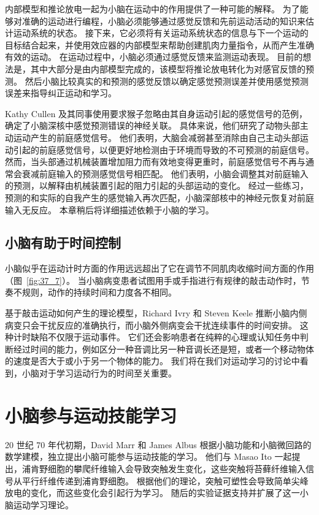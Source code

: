 内部模型和推论放电一起为小脑在运动中的作用提供了一种可能的解释。
为了能够对准确的运动进行编程，小脑必须能够通过感觉反馈和先前运动活动的知识来估计运动系统的状态。
接下来，它必须将有关运动系统状态的信息与下一个运动的目标结合起来，并使用效应器的内部模型来帮助创建肌肉力量指令，从而产生准确有效的运动。
在运动过程中，小脑必须通过感觉反馈来监测运动表现。
目前的想法是，其中大部分是由内部模型完成的，该模型将推论放电转化为对感官反馈的预测。
然后小脑比较真实的和预测的感觉反馈以确定感觉预测误差并使用感觉预测误差来指导纠正运动和学习。


Kathy Cullen 及其同事使用要求猴子忽略由其自身运动引起的感觉信号的范例，确定了小脑深核中感觉预测错误的神经关联。
具体来说，他们研究了动物头部主动运动产生的前庭感觉信号。
他们表明，大脑会减弱甚至消除由自己主动头部运动引起的前庭感觉信号，以便更好地检测由于环境而导致的不可预测的前庭信号。
然而，当头部通过机械装置增加阻力而有效地变得更重时，前庭感觉信号不再与通常会衰减前庭输入的预测感觉信号相匹配。
他们表明，小脑会调整其对前庭输入的预测，以解释由机械装置引起的阻力引起的头部运动的变化。
经过一些练习，预测的和实际的自我产生的感觉输入再次匹配，小脑深部核中的神经元恢复对前庭输入无反应。
本章稍后将详细描述依赖于小脑的学习。



\subsection{小脑有助于时间控制}

小脑似乎在运动计时方面的作用远远超出了它在调节不同肌肉收缩时间方面的作用（图~\ref{fig:37_7}）。
当小脑病变患者试图用手或手指进行有规律的敲击动作时，节奏不规则，动作的持续时间和力度各不相同。


基于敲击运动如何产生的理论模型，Richard Ivry 和 Steven Keele 推断小脑内侧病变只会干扰反应的准确执行，而小脑外侧病变会干扰连续事件的时间安排。
这种计时缺陷不仅限于运动事件。
它们还会影响患者在纯粹的心理或认知任务中判断经过时间的能力，例如区分一种音调比另一种音调长还是短，或者一个移动物体的速度是否大于或小于另一个物体的能力。
我们将在我们对运动学习的讨论中看到，小脑对于学习运动行为的时间至关重要。



\section{小脑参与运动技能学习}

20 世纪 70 年代初期，David Marr 和 James Albus 根据小脑功能和小脑微回路的数学建模，独立提出小脑可能参与运动技能的学习。
他们与 Masao Ito 一起提出，浦肯野细胞的攀爬纤维输入会导致突触发生变化，这些突触将苔藓纤维输入信号从平行纤维传递到浦肯野细胞。
根据他们的理论，突触可塑性会导致简单尖峰放电的变化，而这些变化会引起行为学习。
随后的实验证据支持并扩展了这一小脑运动学习理论。




